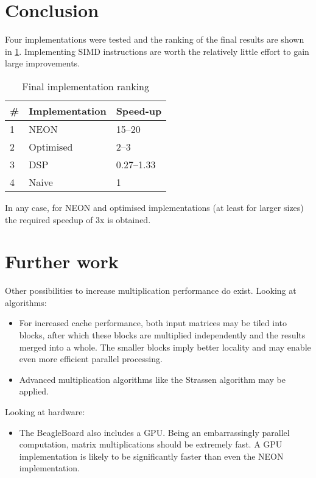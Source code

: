 \documentclass[final]{article}
\begin{document}
\section{Conclusion}
Four implementations were tested and the ranking of the final results are shown in \cref{tab:final-implementation-ranking}.
Implementing SIMD instructions are worth the relatively little effort to gain large improvements.

\begin{table}[H]
	\centering
	\caption{Final implementation ranking}
	\label{tab:final-implementation-ranking}
	\begin{tabular}{lll}
		\toprule
		\textbf{\#} & \textbf{Implementation} & \textbf{Speed-up}\\
		\midrule
		1 & NEON        &  \numrange{15}{20}\\
		2 & Optimised   &  \numrange{2}{3}\\ %
		3 & DSP         &  \numrange{0.27}{1.33}\\ %
		4 & Naive       &  1\\
		\bottomrule
	\end{tabular}
\end{table}

In any case, for NEON and optimised implementations (at least for larger sizes) the required speedup of 3x is obtained.

\section{Further work}
Other possibilities to increase multiplication performance do exist.
Looking at algorithms:
\begin{itemize}
	\item For increased cache performance, both input matrices may be tiled into blocks, after which these blocks are multiplied independently and the results merged into a whole. The smaller blocks imply better locality and may enable even more efficient parallel processing.
	\item Advanced multiplication algorithms like the Strassen algorithm may be applied.
\end{itemize}
Looking at hardware:
\begin{itemize}
	\item The BeagleBoard also includes a GPU. Being an embarrassingly parallel computation, matrix multiplications should be extremely fast. A GPU implementation is likely to be significantly faster than even the NEON implementation.
\end{itemize}
\end{document}
